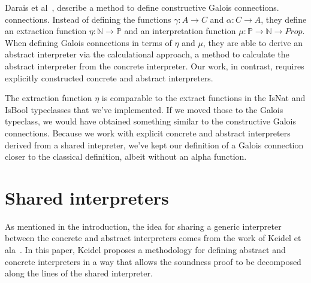 Darais et al~\cite{darais2019constructive}, describe a method to define
constructive Galois connections.
connections. Instead of defining the functions $\gamma : A \rightarrow C$ 
and $\alpha : C \rightarrow A$, they define an extraction function 
$\eta : \mathbb N \rightarrow \mathbb P $ and
an interpretation function $\mu : \mathbb P \rightarrow \mathbb N \rightarrow
Prop$. When defining Galois connections in terms of $\eta$ and $\mu$, they
are able to derive an abstract interpreter via the calculational approach, a
method to calculate the abstract interpreter from the concrete interpreter.
Our work, in contrast, requires explicitly constructed concrete and abstract
interpreters.

The extraction function $\eta$ is comparable to the extract functions in the
IsNat and IsBool typeclasses that we've implemented. If we moved those to the
Galois typeclass, we would have obtained something similar to the constructive
Galois connections. Because we work with explicit concrete and abstract
interpreters derived from a shared intepreter, we've kept our definition of a
Galois connection closer to the classical definition, albeit without an alpha
function.


\section{Shared interpreters}
As mentioned in the introduction, the idea for sharing a generic interpreter
between the concrete and abstract interpreters comes from the work of Keidel et
ala~\cite{keidel2020compositional}. In this paper, Keidel proposes a
methodology for defining abstract and concrete interpreters in a way that
allows the soundness proof to be decomposed along the lines of the shared
interpreter.


